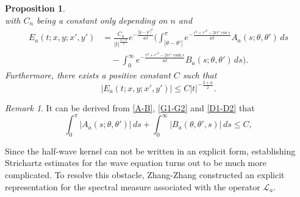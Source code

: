 \documentclass[a4paper,11pt, reqno]{amsart}
\numberwithin{equation}{section}
\theoremstyle{plain}
\newtheorem{proposition}[theorem]{Proposition}
\theoremstyle{definition}
\theoremstyle{remark}
\newtheorem{remark}[theorem]{Remark}
\begin{document}
\begin{proposition}
\begin{equation*}
\end{equation*}
with $C_n$ being a constant only depending on $n$ and 
\begin{equation*}
\begin{aligned}
E_a(t;x,y;x',y') &= \frac{C_n}{|t|^{\frac{2+n}{2}}} e^{-\frac{|y-y'|^2}{4it}} 
\Bigg( \int_{|\theta-\theta'|}^{\pi} e^{-\frac{r^2 + r'^2 - 2rr'\cos s}{4it}} A_a(s;\theta,\theta') \, ds \\
&\quad - \int_0^\infty e^{-\frac{r^2 + r'^2 - 2rr'\cosh s}{4it}} B_a(s;\theta,\theta') \, ds \Bigg).
\end{aligned}
\end{equation*}
Furthermore, there exists a positive constant $C$ such that
\begin{equation*}
|E_a(t; x, y; x', y')| \leq C |t|^{-\frac{2+n}{2}}.
\end{equation*}
\end{proposition}
\begin{remark}
It can be derived from \eqref{A-B}, \eqref{G1-G2} and \eqref{D1-D2} that
\begin{equation}\label{6.20}
\int_{0}^{\pi} |A_a(s; \theta, \theta')| \, ds + \int_{0}^{\infty} |B_a(\theta, \theta', s)| \, ds \leq C,
\end{equation}
\end{remark}
Since the half-wave kernel can not be written in an explicit form, establishing Strichartz estimates for the wave equation turns out to be much more complicated. To resolve this obstacle, Zhang-Zhang \cite{Zhang-Zhang} constructed an explicit representation for the spectral measure associated with the operator $\mathcal{L}_a$.
\end{document}
